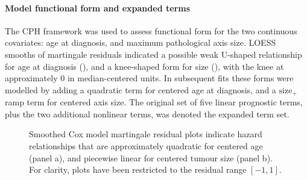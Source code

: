 \documentclass[dissertation.tex]{subfiles}
\begin{document}
\paragraph{Model functional form and expanded terms}
The \gls{CPH} framework was used to assess functional form for the two continuous covariates: age at diagnosis, and maximum pathological axis size.  \gls{LOESS} smooths of martingale residuals \cite{Therneau1990} indicated a possible weak U-shaped relationship for age at diagnosis (), and a knee-shaped form for size (), with the knee at approximately $0$ in median-centered units.  In subsequent fits these forms were modelled by adding a quadratic term for centered age at diagnosis, and a $\mbox{size}_+$ ramp term for centered axis size.  The original set of five linear prognostic terms, plus the two additional nonlinear terms, was denoted the expanded term set.

\begin{figure}
\centering
\caption[Prognostic predictor functional forms]{Smoothed Cox model martingale residual plots indicate hazard relationships that are approximately quadratic for centered age (panel a), and piecewise linear for centered tumour size (panel b).  For clarity, plots have been restricted to the residual range $[-1,1]$.}
\label{fig:nomo-funcform}
\end{figure}
\end{document}
